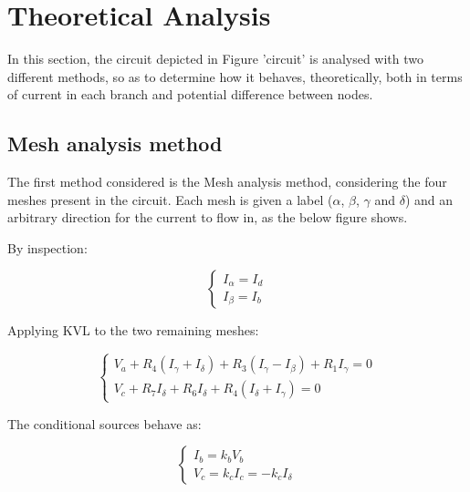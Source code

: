 \section{Theoretical Analysis}
\label{sec:analysis}

In this section, the circuit depicted in Figure 'circuit' is analysed with two different methods, so as to determine how it behaves, theoretically, both in terms of current in each branch and potential difference between nodes.

\subsection{Mesh analysis method}

The first method considered is the Mesh analysis method, considering the four meshes present in the circuit. Each mesh is given a label ($\alpha$, $\beta$, $\gamma$ and $\delta$) and an arbitrary direction for the current to flow in, as the below figure shows.


By inspection:

\begin{equation}
  \begin{cases}
    I_{\alpha} = I_d \\
    I_{\beta} = I_b
  \end{cases}
\end{equation}

Applying KVL to the two remaining meshes:

\begin{equation}
  \begin{cases}
    V_a + R_4 (I_\gamma + I_\delta) + R_3 (I_\gamma - I_\beta) + R_1 I_\gamma = 0 \\
    V_c + R_7 I_\delta + R_6 I_\delta + R_4 (I_\delta + I_\gamma) = 0
  \end{cases}
\end{equation}

The conditional sources behave as:

\begin{equation}
  \begin{cases}
  I_b = k_b V_b \\
  V_c = k_c I_c = - k_c I_\delta
  \end{cases}
\end{equation}

